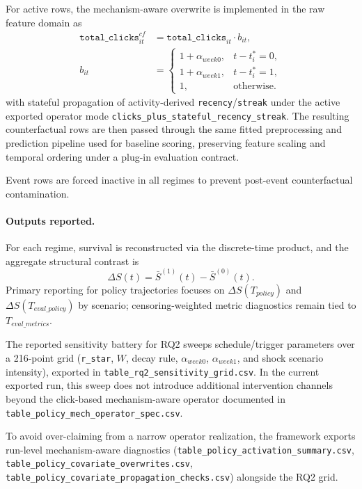 For active rows, the mechanism-aware overwrite is implemented in the raw feature domain as
\begin{equation*}
\begin{aligned}
\texttt{total\_clicks}^{cf}_{it}
&=\texttt{total\_clicks}_{it}\cdot b_{it},\\
b_{it}
&=\begin{cases}
1+\alpha_{week0}, & t-t_i^*=0,\\
1+\alpha_{week1}, & t-t_i^*=1,\\
1, & \text{otherwise.}
\end{cases}
\end{aligned}
\end{equation*}
with stateful propagation of activity-derived \texttt{recency}/\texttt{streak} under the active exported operator mode \nolinkurl{clicks_plus_stateful_recency_streak}. The resulting counterfactual rows are then passed through the same fitted preprocessing and prediction pipeline used for baseline scoring, preserving feature scaling and temporal ordering under a plug-in evaluation contract.

Event rows are forced inactive in all regimes to prevent post-event counterfactual contamination.

\paragraph*{Outputs reported.}
For each regime, survival is reconstructed via the discrete-time product, and the aggregate structural contrast is
\[
\Delta S(t)=\bar S^{(1)}(t)-\bar S^{(0)}(t).
\]
Primary reporting for policy trajectories focuses on $\Delta S(T_{policy})$ and $\Delta S(T_{eval\_policy})$ by scenario; censoring-weighted metric diagnostics remain tied to $T_{eval\_metrics}$.

The reported sensitivity battery for RQ2 sweeps schedule/trigger parameters over a 216-point grid (\texttt{r\_star}, $W$, decay rule, $\alpha_{week0}$, $\alpha_{week1}$, and shock scenario intensity), exported in \nolinkurl{table_rq2_sensitivity_grid.csv}. In the current exported run, this sweep does not introduce additional intervention channels beyond the click-based mechanism-aware operator documented in \nolinkurl{table_policy_mech_operator_spec.csv}.

To avoid over-claiming from a narrow operator realization, the framework exports run-level mechanism-aware diagnostics (\nolinkurl{table_policy_activation_summary.csv}, \nolinkurl{table_policy_covariate_overwrites.csv}, \nolinkurl{table_policy_covariate_propagation_checks.csv}) alongside the RQ2 grid.

